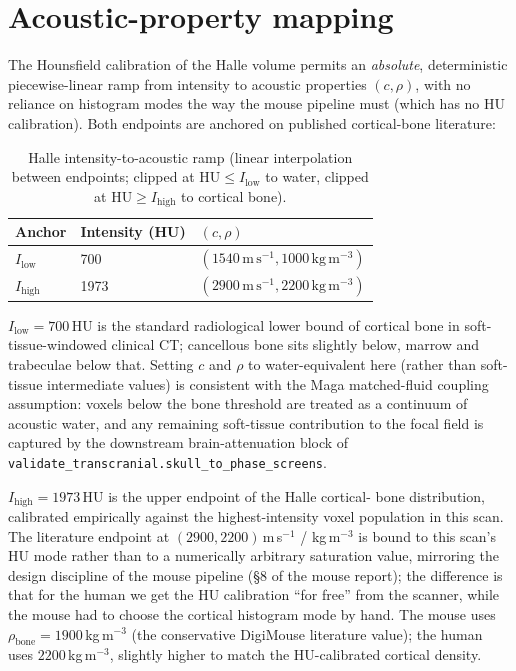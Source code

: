 \documentclass{compactarticle}
\begin{document}
\section{Acoustic-property mapping}\label{sec:acoustic}
The Hounsfield calibration of the Halle volume permits an
{\em absolute}, deterministic piecewise-linear ramp from intensity to
acoustic properties $(c, \rho)$, with no reliance on histogram modes
the way the mouse pipeline must (which has no HU calibration). Both
endpoints are anchored on published cortical-bone literature:

\begin{table}[H]
\centering
\caption{Halle intensity-to-acoustic ramp (linear interpolation between
endpoints; clipped at $\mathrm{HU}\leq I_\mathrm{low}$ to water,
clipped at $\mathrm{HU}\geq I_\mathrm{high}$ to cortical
bone).}\label{tab:acoustic}
\begin{tabular}{lll}
\toprule
Anchor & Intensity (HU) & $(c, \rho)$ \\
\midrule
$I_\mathrm{low}$  & 700  & $(1540\,\mathrm{m\,s^{-1}}, 1000\,\mathrm{kg\,m^{-3}})$ \\
$I_\mathrm{high}$ & 1973 & $(2900\,\mathrm{m\,s^{-1}}, 2200\,\mathrm{kg\,m^{-3}})$ \\
\bottomrule
\end{tabular}
\end{table}

$I_\mathrm{low}=700$\,HU is the standard radiological lower bound of
cortical bone in soft-tissue-windowed clinical CT; cancellous bone
sits slightly below, marrow and trabeculae below that. Setting
$c$ and $\rho$ to water-equivalent here (rather than soft-tissue
intermediate values) is consistent with the Maga matched-fluid coupling
assumption: voxels below the bone threshold are treated as a continuum
of acoustic water, and any remaining soft-tissue contribution to the
focal field is captured by the downstream brain-attenuation block of
\texttt{validate\_transcranial.skull\_to\_phase\_screens}.

$I_\mathrm{high}=1973$\,HU is the upper endpoint of the Halle cortical-
bone distribution, calibrated empirically against the highest-intensity
voxel population in this scan. The literature endpoint at $(2900,
2200)$\,m\,s$^{-1}$ / kg\,m$^{-3}$ is bound to this scan's HU mode rather
than to a numerically arbitrary saturation value, mirroring the design
discipline of the mouse pipeline (\S8 of the mouse report); the
difference is that for the human we get the HU calibration ``for
free'' from the scanner, while the mouse had to choose the cortical
histogram mode by hand. The mouse uses
$\rho_\mathrm{bone}=1900$\,kg\,m$^{-3}$ (the conservative DigiMouse
literature value); the human uses $2200$\,kg\,m$^{-3}$, slightly higher
to match the HU-calibrated cortical density.
\end{document}
